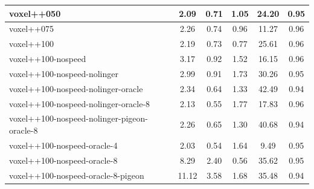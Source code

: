 \begin{table}
\begin{longtable}{|l|c|c|c|c|c|}
voxel++050 & {\cellcolor[HTML]{DCEBE7}} \color[HTML]{000000} 2.09 & {\cellcolor[HTML]{EBF2F0}} \color[HTML]{000000} 0.71 & {\cellcolor[HTML]{EBF2F0}} \color[HTML]{000000} 1.05 & 24.20 & 0.95 \\ \hline
voxel++075 & {\cellcolor[HTML]{D9EAE6}} \color[HTML]{000000} 2.26 & {\cellcolor[HTML]{EBF2F0}} \color[HTML]{000000} 0.74 & {\cellcolor[HTML]{EBF2F0}} \color[HTML]{000000} 0.96 & 11.27 & 0.96 \\ \hline
voxel++100 & {\cellcolor[HTML]{DAEAE6}} \color[HTML]{000000} 2.19 & {\cellcolor[HTML]{EBF2F0}} \color[HTML]{000000} 0.73 & {\cellcolor[HTML]{EBF2F0}} \color[HTML]{000000} 0.77 & 25.61 & 0.96 \\ \hline
voxel++100-nospeed & {\cellcolor[HTML]{CBE3DE}} \color[HTML]{000000} 3.17 & {\cellcolor[HTML]{EBF2F0}} \color[HTML]{000000} 0.92 & {\cellcolor[HTML]{A7D1C9}} \color[HTML]{000000} 1.52 & 16.15 & 0.96 \\ \hline
voxel++100-nospeed-nolinger & {\cellcolor[HTML]{CEE4E0}} \color[HTML]{000000} 2.99 & {\cellcolor[HTML]{EBF2F0}} \color[HTML]{000000} 0.91 & {\cellcolor[HTML]{89C3B7}} \color[HTML]{000000} 1.73 & 30.26 & 0.95 \\ \hline
voxel++100-nospeed-nolinger-oracle & {\cellcolor[HTML]{D8E9E5}} \color[HTML]{000000} 2.34 & {\cellcolor[HTML]{EBF2F0}} \color[HTML]{000000} 0.64 & {\cellcolor[HTML]{C2DED8}} \color[HTML]{000000} 1.33 & 42.49 & 0.94 \\ \hline
voxel++100-nospeed-nolinger-oracle-8 & {\cellcolor[HTML]{DBEBE7}} \color[HTML]{000000} 2.13 & {\cellcolor[HTML]{EBF2F0}} \color[HTML]{000000} 0.55 & {\cellcolor[HTML]{83C0B4}} \color[HTML]{000000} 1.77 & 17.83 & 0.96 \\ \hline
voxel++100-nospeed-nolinger-pigeon-oracle-8 & {\cellcolor[HTML]{D9EAE6}} \color[HTML]{000000} 2.26 & {\cellcolor[HTML]{EBF2F0}} \color[HTML]{000000} 0.65 & {\cellcolor[HTML]{C7E1DB}} \color[HTML]{000000} 1.30 & 40.68 & 0.94 \\ \hline
voxel++100-nospeed-oracle-4 & {\cellcolor[HTML]{DCEBE8}} \color[HTML]{000000} 2.03 & {\cellcolor[HTML]{EBF2F0}} \color[HTML]{000000} 0.54 & {\cellcolor[HTML]{96C9BF}} \color[HTML]{000000} 1.64 & 9.49 & 0.95 \\ \hline
voxel++100-nospeed-oracle-8 & {\cellcolor[HTML]{7FBEB1}} \color[HTML]{000000} 8.29 & {\cellcolor[HTML]{9ACBC1}} \color[HTML]{000000} 2.40 & {\cellcolor[HTML]{EBF2F0}} \color[HTML]{000000} 0.56 & 35.62 & 0.95 \\ \hline
voxel++100-nospeed-oracle-8-pigeon & {\cellcolor[HTML]{55AA99}} \color[HTML]{000000} 11.12 & {\cellcolor[HTML]{55AA99}} \color[HTML]{000000} 3.58 & {\cellcolor[HTML]{90C7BC}} \color[HTML]{000000} 1.68 & 35.48 & 0.94 \\ \hline

\end{longtable}
\end{table}
